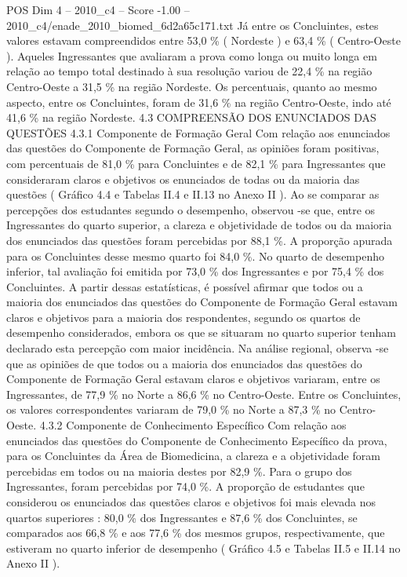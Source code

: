 \begin{textsample}{POS Dim 4 – 2010\_c4 – Score -1.00 – 2010\_c4/enade\_2010\_biomed\_6d2a65c171.txt}
Já entre os Concluintes, estes valores estavam compreendidos entre 53,0 \% ( Nordeste ) e 63,4 \% ( Centro-Oeste ).
Aqueles Ingressantes que avaliaram a prova como longa ou muito longa em relação ao tempo total destinado à sua resolução variou de 22,4 \% na região Centro-Oeste a 31,5 \% na região Nordeste.
Os percentuais, quanto ao mesmo aspecto, entre os Concluintes, foram de 31,6 \% na região Centro-Oeste, indo até 41,6 \% na região Nordeste. 4.3 COMPREENSÃO DOS ENUNCIADOS DAS QUESTÕES 4.3.1 Componente de Formação Geral Com relação aos enunciados das questões do Componente de Formação Geral, as opiniões foram positivas, com percentuais de 81,0 \% para Concluintes e de 82,1 \% para Ingressantes que consideraram claros e objetivos os enunciados de todas ou da maioria das questões ( Gráfico 4.4 e Tabelas II.4 e II.13 no Anexo II ).
Ao se comparar as percepções dos estudantes segundo o desempenho, observou -se que, entre os Ingressantes do quarto superior, a clareza e objetividade de todos ou da maioria dos enunciados das questões foram percebidas por 88,1 \%.
A proporção apurada para os Concluintes desse mesmo quarto foi 84,0 \%.
No quarto de desempenho inferior, tal avaliação foi emitida por 73,0 \% dos Ingressantes e por 75,4 \% dos Concluintes.
A partir dessas estatísticas, é possível afirmar que todos ou a maioria dos enunciados das questões do Componente de Formação Geral estavam claros e objetivos para a maioria dos respondentes, segundo os quartos de desempenho considerados, embora os que se situaram no quarto superior tenham declarado esta percepção com maior incidência.
Na análise regional, observa -se que as opiniões de que todos ou a maioria dos enunciados das questões do Componente de Formação Geral estavam claros e objetivos variaram, entre os Ingressantes, de 77,9 \% no Norte a 86,6 \% no Centro-Oeste.
Entre os Concluintes, os valores correspondentes variaram de 79,0 \% no Norte a 87,3 \% no Centro-Oeste. 4.3.2 Componente de Conhecimento Específico Com relação aos enunciados das questões do Componente de Conhecimento Específico da prova, para os Concluintes da Área de Biomedicina, a clareza e a objetividade foram percebidas em todos ou na maioria destes por 82,9 \%.
Para o grupo dos Ingressantes, foram percebidas por 74,0 \%.
A proporção de estudantes que considerou os enunciados das questões claros e objetivos foi mais elevada nos quartos superiores : 80,0 \% dos Ingressantes e 87,6 \% dos Concluintes, se comparados aos 66,8 \% e aos 77,6 \% dos mesmos grupos, respectivamente, que estiveram no quarto inferior de desempenho ( Gráfico 4.5 e Tabelas II.5 e II.14 no Anexo II ).

\end{textsample}
